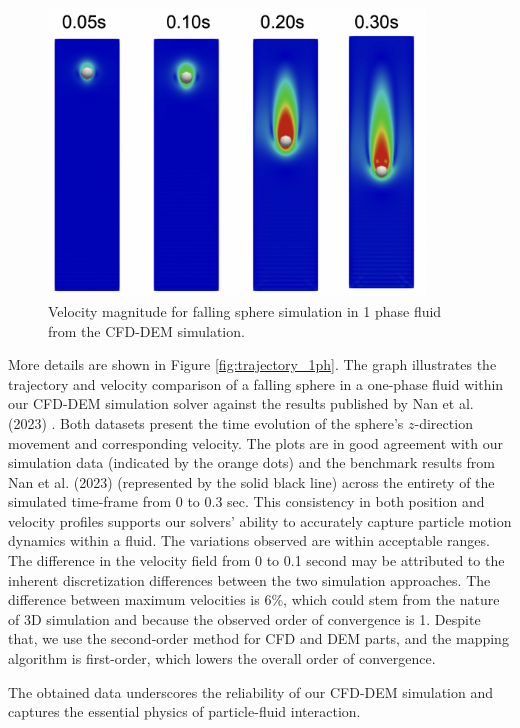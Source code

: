 \begin{figure}[!ht]
    \centering
    \includegraphics[width=10cm]{Images/chap3/1ph_exp_me.png}
    \caption{Velocity magnitude for falling sphere simulation in 1 phase fluid from the CFD-DEM simulation.}
    \label{fig:1ph_exp_me}
\end{figure}

More details are shown in Figure \ref{fig:trajectory_1ph}. The graph illustrates the trajectory and velocity comparison of a falling sphere in a one-phase fluid within our CFD-DEM simulation solver against the results published by Nan et al. (2023) \cite{nan2023high}. Both datasets present the time evolution of the sphere's $z$-direction movement and corresponding velocity. The plots are in good agreement with our simulation data (indicated by the orange dots) and the benchmark results from Nan et al. (2023)\cite{nan2023high} (represented by the solid black line) across the entirety of the simulated time-frame from 0 to 0.3 sec. This consistency in both position and velocity profiles supports our solvers' ability to accurately capture particle motion dynamics within a fluid. The variations observed are within acceptable ranges. The difference in the velocity field from 0 to 0.1 second may be attributed to the inherent discretization differences between the two simulation approaches. The difference between maximum velocities is $6$\%, which could stem from the nature of 3D simulation and because the observed order of convergence is 1. Despite that, we use the second-order method for CFD and DEM parts, and the mapping algorithm is first-order, which lowers the overall order of convergence.

The obtained data underscores the reliability of our CFD-DEM simulation and captures the essential physics of particle-fluid interaction.

